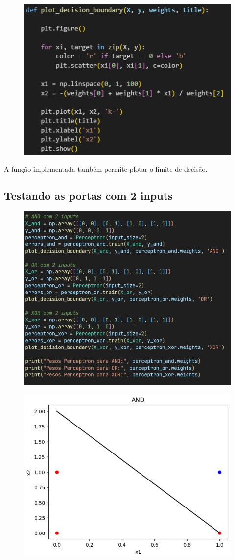 \documentclass[12pt]{article}
\begin{document}
\begin{figure}[h]
	\centering
	\includegraphics[width=.8\textwidth]{image2.png}
\end{figure}

A função implementada também permite plotar o limite de decisão.

\subsection*{Testando as portas com 2 inputs}

\begin{figure}[ht]
	\centering
	\includegraphics[width=.8\textwidth]{image3.png}
\end{figure}

\begin{figure}[ht]
	\centering
	\includegraphics[width=.8\textwidth]{image4.png}
\end{figure}
\end{document}
